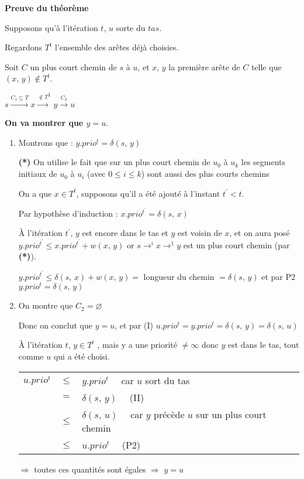 \vspace*{0.16cm}
\textbf{\sffamily\small Preuve du théorème}

Supposons qu'à l'itération $t$, $u$ sorte du $tas$.

Regardons $T^{t}$ l'ensemble des arêtes déjà choisies.

Soit $C$ un plus court chemin de $s$ à $u$, et $x,\, y$ la première arête de $C$ telle que $(x,\, y) \notin T^{t}$.

$s\overset{C_{1}\subseteq T}{\longrightarrow} x \overset{\notin T}{\longrightarrow}^{1} y\overset{C_{2}}{\longrightarrow} u$

\textbf{On va montrer que $y = u$}.

\begin{enumerate}[label=(\Roman*)]
\item Montrons que : $y.prio^{t} = \delta(s,\,y)$

\textbf{(*)} On utilise le fait que sur un plus court chemin de $u_{0}$ à $u_{k}$ les segments initiaux de $u_{0}$ à $u_{i}$ (avec $0 \leq i \leq k$) sont aussi des plus courts chemins

On a que $x \in T^{t}$, supposons qu'il a été ajouté à l'instant $t^{\prime} < t$.

Par hypothèse d'induction : $x.prio^{t^{\prime}} = \delta(s,\, x)$

À l'itération $t^{\prime}$, $y$ est encore dans le tas et $y$ est voisin de $x$, et on aura posé $y.prio^{t^{\prime}} \leq x.prio^{t^{\prime}} + w(x,\, y)$ or $s \longrightarrow^{i} x \longrightarrow^{1} y$ est un plus court chemin (par \textbf{(*)}).

$y.prio^{t^{\prime}} \leq \delta(s,\, x) + w(x,\, y) = $ longueur du chemin $ = \delta(s,\, y)$ et par P2 $y.prio^{t} = \delta(s,\, y)$

\item On montre que $C_{2} = \varnothing$

Donc on conclut que $y = u$, et par (I) $u.prio^{t} = y.prio^{t} = \delta(s,\, y) = \delta(s,\, u)$

À l'itération $t$, $y \in T^{t}$ , mais y a une priorité $\neq \infty$ donc $y$ est dans le tas, tout comme $u$ qui a été choisi.

\begin{tabular}{l l l}
	$u.prio^{t}$ & $\leq$ & $y.prio^{t}\quad$ car $u$ sort du tas\\
	& $=$ & $\delta(s,\, y)\quad$ (II)\\
	& $\leq$ & $\delta(s,\, u)\quad$ car $y$ précède $u$ sur un plus court chemin\\
	& $\leq$ & $u.prio^{t}\quad$ (P2)
\end{tabular}

$\Rightarrow$ toutes ces quantités sont égales $\Rightarrow$ $y = u$

\end{enumerate}
